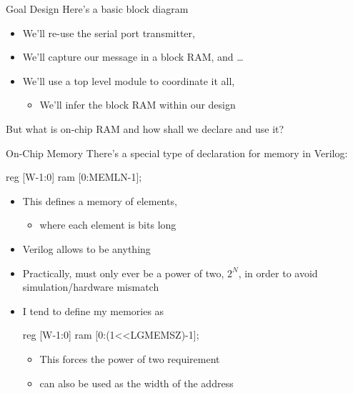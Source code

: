 \documentclass[style=gt,mode=present,paper=screen]{powerdot}
\begin{document}
%
%
%
\begin{slide}[bm=,toc=,method=direct]{Goal Design}
Here's a basic block diagram
\begin{center}
{\def\svgwidth{0.5\slidewidth}}
\end{center}
\begin{itemize}
\item We'll re-use the serial port transmitter, 
\item We'll capture our message in a block RAM, and \ldots
\item We'll use a top level module to coordinate it all, 
\begin{itemize}
	\item We'll infer the block RAM within our  design
\end{itemize}
\end{itemize}
But what is on-chip RAM and how shall we declare and use it?
\end{slide}
%
%
%
\begin{slide}[toc={On-chip RAM},method=direct]{On-Chip Memory}
There's a special type of declaration for memory in Verilog:
\begin{zformal}
reg	[W-1:0]	ram	[0:MEMLN-1];
\end{zformal}
\begin{itemize}
\item This defines a memory of  elements,
	\begin{itemize}
	\item[] where each element is  bits long
	\end{itemize}
\item Verilog allows  to be anything
\item Practically,  must only ever be a power of two, $2^N$,
	in order to avoid simulation/hardware mismatch
\item I tend to define my memories as
\begin{zformal}
reg	[W-1:0]	ram	[0:(1<<LGMEMSZ)-1];
\end{zformal}
	\begin{itemize}
	\item This forces the power of two requirement
	\item {} can also be used as the width of the address
	\end{itemize}
\end{itemize}
\end{slide}
\end{document}
